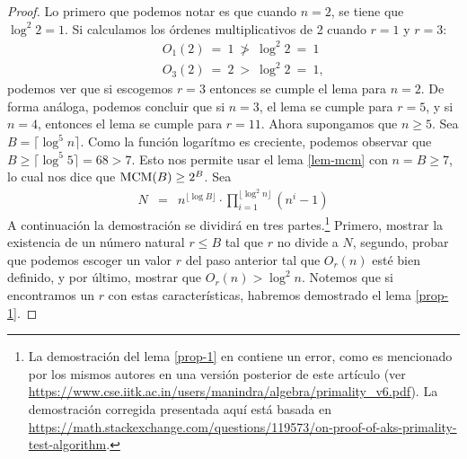 \documentclass[10pt]{article}
\newcommand{\0}{\mathbf{0}}
\newcommand{\1}{\mathbf{1}}
\newcommand{\MCM}{{\rm MCM}}
\newcommand{\+}{\oplus}
\newcommand{\comentario}[1]{}
\newcommand{\comentarioin}[1]{}
\theoremstyle{remark}
\theoremstyle{remark}
\begin{document}
	\begin{proof}
		Lo primero que podemos notar es que cuando $n=2$, se tiene que $\log^2 2 =1$. Si calculamos los órdenes multiplicativos de 2 cuando $r=1$ y $r=3$:
		\begin{eqnarray*}
			&&O_1(2) \ = \ 1 \ \not> \ \log ^2 2 \ =\ 1\\
			&&O_3(2) \ = \ 2  \ > \ \log ^2 2 \ =\ 1,
		\end{eqnarray*}
		podemos ver que si escogemos $r=3$ entonces se cumple el lema para $n=2$. De forma análoga, podemos concluir que si $n = 3$, el lema se cumple para $r = 5$, y si $n=4$, entonces el lema se cumple para $r= 11$.
		Ahora supongamos que $n \geq 5$. Sea $B = \lceil \log^5 n \rceil$. Como la función logarítmo es creciente, podemos observar que $B \geq \lceil \log ^5 5\rceil = 68 > 7$. Esto nos permite usar el lema \ref{lem-mcm} con $n = B\geq 7$, lo cual nos dice que $\MCM(B) \geq 2^{B}$.
		Sea
\begin{eqnarray*}
		N &=& n^{\lfloor\log B\rfloor} \cdot\prod_{i=1}^{\lfloor \log ^2n \rfloor} (n^i-1)
\end{eqnarray*}
A continuación la demostración se dividirá en tres partes.\footnote{La
  demostración del lema \ref{prop-1} en \cite{AKS04} contiene un
  error, como es mencionado por los mismos autores en una versión
  posterior de este artículo (ver \url{https://www.cse.iitk.ac.in/users/manindra/algebra/primality_v6.pdf}). La demostración corregida presentada aquí está basada en \url{https://math.stackexchange.com/questions/119573/on-proof-of-aks-primality-test-algorithm}.}
Primero, mostrar la existencia de un número natural
 $r\leq B$ tal que $r$ no divide a $N$,  segundo, probar que podemos escoger un valor $r$ del paso anterior tal que $O_r(n)$ esté bien definido, y por último, mostrar que $O_r(n)>\log ^2 n$. Notemos que si encontramos un $r$ con estas características, habremos demostrado el lema \ref{prop-1}.


\end{proof}
\end{document}
